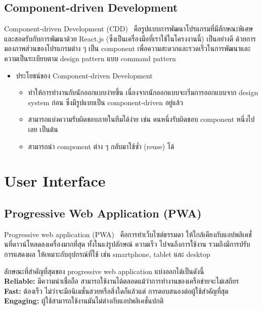 \subsection{Component-driven Development}
Component-driven Development (CDD)~\cite{cdd} คือรูปแบบการพัฒนาโปรแกรมที่มีลักษณะพิเศษและสอดรับกับการพัฒนาด้วย React.js (ซึ่งเป็นเครื่องมือที่เราใช้ในโครงงานนี้) เป็นอย่างดี ด้วยการมองภาพส่วนของโปรแกรมต่าง ๆ เป็น component เพื่อความสะดวกและรวดเร็วในการพัฒนาและความเป็นระเบียบตาม design pattern แบบ command pattern
\begin{itemize}
  \item ประโยชน์ของ Component-driven Development
  \begin{itemize}
    \item ทำให้การทำงานกับนักออกแบบง่ายขึ้น เนื่องจากนักออกแบบจะเริ่มการออกแบบจาก design system ก่อน ซึ่งมีรูปแบบเป็น component-driven อยู่แล้ว
    \item สามารถแบ่งความรับผิดชอบภายในทีมได้ง่าย เช่น คนหนึ่งรับผิดชอบ component หนึ่งไปเลย เป็นต้น
    \item สามารถนำ component ต่าง ๆ กลับมาใช้ซ้ำ (reuse) ได้
  \end{itemize}
\end{itemize}

\section{User Interface}
\subsection{Progressive Web Application (PWA)}
Progressive web application (PWA)~\cite{pwa} คือการทําเว็บไซต์ธรรมดา ให้ใกล้เคียงกับแอปพลิเคชั่นที่ดาวน์โหลดลงเครื่องมากที่สุด ทั้งในแง่รูปลักษณ์ ความเร็ว ไปจนถึงการใช้งาน รวมถึงมีการปรับการแสดงผล
ให้เหมาะกับอุปกรณ์ที่ใช้ เช่น smartphone, tablet และ desktop

ลักษณะที่สําคัญที่สุดของ progressive web application แบ่งออกได้เป็นดังนี้ \\
\textbf{Reliable:} มีความน่าเชื่อถือ สามารถใช้งานได้ตลอดแม้ว่าการทํางานของเครือข่ายจะไม่เสถียร \\
\textbf{Fast:} ต้องเร็ว ไม่ว่าจะมีอนิเมชั่นสวยหรือสิ่งใดก็แล้วแต่ การตอบสนองต่อผู้ใช้สําคัญที่สุด \\
\textbf{Engaging:} ผู้ใช้สามารถใช้งานมันไม่ต่างกับแอปพลิเคชั่นปกติ

